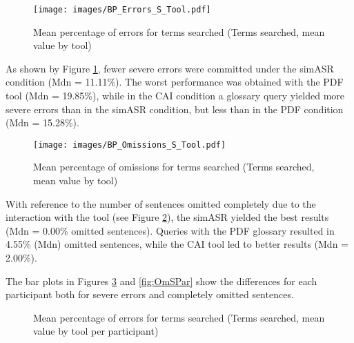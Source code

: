 \begin{figure}
\texttt{[image: images/BP\_Errors\_S\_Tool.pdf]}
\caption[Mean percentage of errors (Terms searched, by tool)]{Mean percentage of errors for terms searched (Terms searched, mean value by tool)}
\label{fig:BPErrSTool}
\end{figure}

As shown by Figure \ref{fig:BPErrSTool}, fewer severe errors were committed under the simASR condition (Mdn = 11.11\%). The worst performance was obtained with the PDF tool (Mdn = 19.85\%), while in the CAI condition a glossary query yielded more severe errors than in the simASR condition, but less than in the PDF condition (Mdn = 15.28\%).

\begin{figure}
\texttt{[image: images/BP\_Omissions\_S\_Tool.pdf]}
\caption[Mean percentage of omissions (Terms searched, by tool)]{Mean percentage of omissions for terms searched (Terms searched, mean value by tool)}
\label{fig:BPOmSTool}
\end{figure}

With reference to the number of sentences omitted completely due to the interaction with the tool (see Figure \ref{fig:BPOmSTool}), the simASR yielded the best results (Mdn = 0.00\% omitted sentences). Queries with the PDF glossary resulted in 4.55\% (Mdn) omitted sentences, while the CAI tool led to better results (Mdn = 2.00\%).

The bar plots in Figures \ref{fig:ErrSPar} and \ref{fig:OmSPar} show the differences for each participant both for severe errors and completely omitted sentences.

\begin{figure}
\caption[Mean percentage of errors (Terms searched, by tool and participant]{Mean percentage of errors for terms searched (Terms searched, mean value by tool per participant)}
\label{fig:ErrSPar}
\end{figure}

